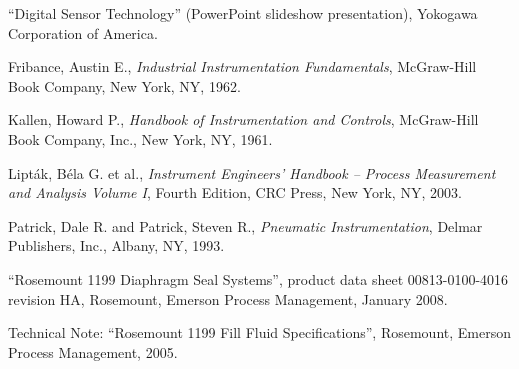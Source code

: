 \vskip 10pt

\noindent
``Digital Sensor Technology'' (PowerPoint slideshow presentation), Yokogawa Corporation of America.

\vskip 10pt

\noindent
Fribance, Austin E., \textit{Industrial Instrumentation Fundamentals}, McGraw-Hill Book Company, New York, NY, 1962.



\vskip 10pt

\noindent
Kallen, Howard P., \textit{Handbook of Instrumentation and Controls}, McGraw-Hill Book Company, Inc., New York, NY, 1961.

\vskip 10pt

\noindent
Lipt\'ak, B\'ela G. et al., \textit{Instrument Engineers' Handbook -- Process Measurement and Analysis Volume I}, Fourth Edition, CRC Press, New York, NY, 2003.

\vskip 10pt

\noindent
Patrick, Dale R. and Patrick, Steven R., \textit{Pneumatic Instrumentation}, Delmar Publishers, Inc., Albany, NY, 1993.

\vskip 10pt

\noindent
``Rosemount 1199 Diaphragm Seal Systems'', product data sheet 00813-0100-4016 revision HA, Rosemount, Emerson Process Management, January 2008.

\vskip 10pt

\noindent
Technical Note: ``Rosemount 1199 Fill Fluid Specifications'', Rosemount, Emerson Process Management, 2005.















